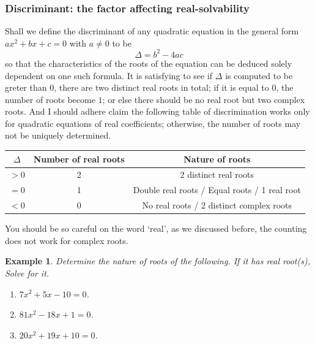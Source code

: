 \documentclass[12pt]{article}
\newtheorem*{example}{Example}
\begin{document}
    \subsubsection*{Discriminant: the factor affecting real-solvability}

    Shall we define the discriminant of any quadratic equation in the general form $ax^2+bx+c=0$ with $a\neq 0$ to be \[\Delta=b^2-4ac\] so that the characteristics of the roots of the equation can be deduced solely dependent on one such formula. It is satisfying to see if $\Delta$ is computed to be greter than $0$, there are two distinct real roots in total; if it is equal to $0$, the number of roots become $1$; or else there should be no real root but two complex roots. And I should adhere claim the following table of discrimination works only for quadratic equations of real coefficients; otherwise, the number of roots may not be uniquely determined.

    \begin{center}
        \begin{tabular}{|c|c|c|}
            \hline
            $\Delta$&Number of real roots&Nature of roots\\
            \hline
            $>0$&2&2 distinct real roots\\
            \hline
            $=0$&1&Double real roots / Equal roots / 1 real root\\
            \hline
            $<0$&0&No real roots / 2 distinct complex roots\\
            \hline
        \end{tabular}
    \end{center}

    You should be so careful on the word `real', as we discussed before, the counting does not work for complex roots.

    \begin{example}
        Determine the nature of roots of the following. If it has real root(s), Solve for it.\begin{enumerate}
            \item[(a)] $7x^2+5x-10=0$.
            \item[(b)] $81x^2-18x+1=0$.
            \item[(c)] $20x^2+19x+10=0$.
        \end{enumerate}
    \end{example}
\end{document}
